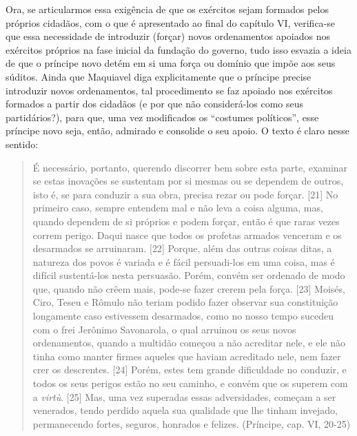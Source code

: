 Ora, se articularmos essa exigência de que os exércitos sejam formados
pelos próprios cidadãos, com o que é apresentado ao final do capítulo
VI, verifica-se que essa necessidade de introduzir (forçar) novos
ordenamentos apoiados nos exércitos próprios na fase inicial da fundação
do governo, tudo isso esvazia a ideia de que o príncipe novo detém em si
uma força ou domínio que impõe aos seus súditos. Ainda que Maquiavel
diga explicitamente que o príncipe precise introduzir novos
ordenamentos, tal procedimento se faz apoiado nos exércitos formados a
partir dos cidadãos (e por que não considerá-los como seus
partidários?), para que, uma vez modificados os ``costumes políticos'',
esse príncipe novo seja, então, admirado e consolide o seu apoio. O
texto é claro nesse sentido:

\begin{quote}
É necessário, portanto, querendo discorrer bem sobre esta parte,
examinar se estas inovações se sustentam por si mesmas ou se dependem de
outros, isto é, se para conduzir a sua obra, precisa rezar ou pode
forçar. {[}21{]} No primeiro caso, sempre entendem mal e não leva a
coisa alguma, mas, quando dependem de si próprios e podem forçar, então
é que raras vezes correm perigo. Daqui nasce que todos os profetas
armados venceram e os desarmados se arruinaram. {[}22{]} Porque, além
das outras coisas ditas, a natureza dos povos é variada e é fácil
persuadi-los em uma coisa, mas é difícil sustentá-los nesta persuasão.
Porém, convém ser ordenado de modo que, quando não crêem mais, pode-se
fazer crerem pela força. {[}23{]} Moisés, Ciro, Teseu e Rômulo não
teriam podido fazer observar sua constituição longamente caso estivessem
desarmados, como no nosso tempo sucedeu com o frei Jerônimo Savonarola,
o qual arruinou os seus novos ordenamentos, quando a multidão começou a
não acreditar nele, e ele não tinha como manter firmes aqueles que
haviam acreditado nele, nem fazer crer os descrentes. {[}24{]} Porém,
estes tem grande dificuldade no conduzir, e todos os seus perigos estão
no seu caminho, e convém que os superem com a \emph{virtù}. {[}25{]}
Mas, uma vez superadas essas adversidades, começam a ser venerados,
tendo perdido aquela sua qualidade que lhe tinham invejado, permanecendo
fortes, seguros, honrados e felizes. (Príncipe, cap. VI, 20-25)
\end{quote}


